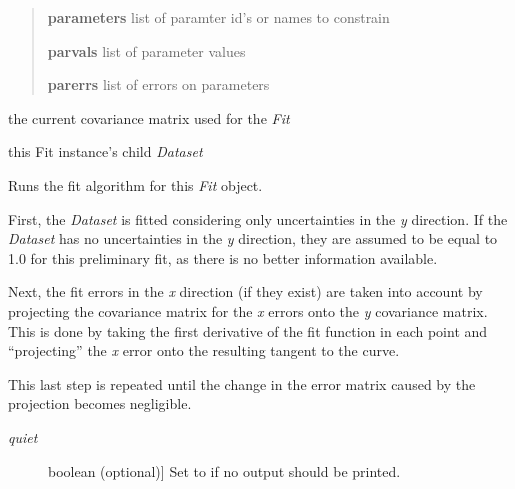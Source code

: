 \documentclass[a4paper,10pt,english]{sphinxmanual}
\begin{document}
\begin{fulllineitems}
\begin{fulllineitems}
\begin{quote}
\textbf{parameters} list of paramter id's or names to constrain

\textbf{parvals}    list of parameter values

\textbf{parerrs}    list of errors on parameters
\end{quote}

\end{fulllineitems}


\begin{fulllineitems}
\label{index:kafe.fit.Fit.current_cov_mat}
the current covariance matrix used for the \emph{Fit}

\end{fulllineitems}


\begin{fulllineitems}
\label{index:kafe.fit.Fit.dataset}
this Fit instance's child \emph{Dataset}

\end{fulllineitems}


\begin{fulllineitems}
\label{index:kafe.fit.Fit.do_fit}
Runs the fit algorithm for this \emph{Fit} object.

First, the \emph{Dataset} is fitted considering only uncertainties in the
\emph{y} direction. If the \emph{Dataset} has no uncertainties in the \emph{y}
direction, they are assumed to be equal to 1.0 for this preliminary
fit, as there is no better information available.

Next, the fit errors in the \emph{x} direction (if they exist) are taken
into account by projecting the covariance matrix for the \emph{x} errors
onto the \emph{y} covariance matrix. This is done by taking the first
derivative of the fit function in each point and ``projecting'' the \emph{x}
error onto the resulting tangent to the curve.

This last step is repeated until the change in the error matrix caused
by the projection becomes negligible.
\begin{description}
\item[{\emph{quiet}}] \leavevmode{[}boolean (optional){]}
Set to  if no output should be printed.


\end{description}
\end{fulllineitems}
\end{fulllineitems}
\end{document}
